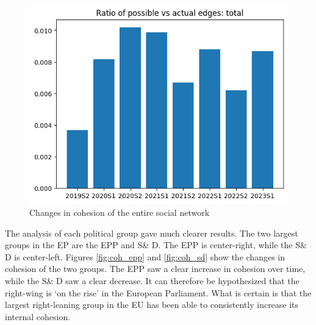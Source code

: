 \documentclass[lettersize,journal]{IEEEtran}
\begin{document}
\begin{figure}[h]
	\centering
	\begin{minipage}[b]{0.23\textwidth}
		\includegraphics[width=\textwidth]{coh_all.png}
		\caption{Changes in cohesion of the entire social network}
		\label{fig:coh_all}
	\end{minipage}
	\hfill
\end{figure}

The analysis of each political group gave much clearer results. The two largest groups in the EP are the EPP and S\& D. The EPP is center-right, while the S\& D is center-left. Figures \ref{fig:coh_epp} and \ref{fig:coh_sd} show the changes in cohesion of the two groups. The EPP saw a clear increase in cohesion over time, while the S\& D saw a clear decrease. It can therefore be hypothesized that the right-wing is `on the rise' in the European Parliament. What is certain is that the largest right-leaning group in the EU has been able to consistently increase its internal cohesion.
\end{document}
